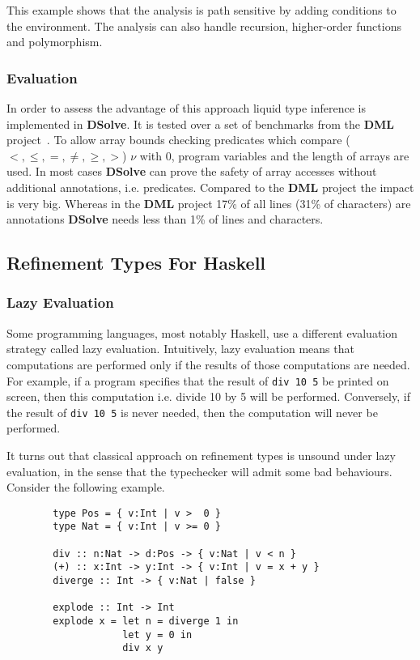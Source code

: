 \documentclass[a4paper,UKenglish]{lipics-v2016}
\begin{document}
This example shows that the analysis is path sensitive by adding conditions to the environment.
The analysis can also handle recursion, higher-order functions and polymorphism.

\subsubsection{Evaluation}

In order to assess the advantage of this approach liquid type inference is implemented in \textbf{DSolve}.
It is tested over a set of benchmarks from the \textbf{DML} project~\cite{Xi:1998:EAB}.
To allow array bounds checking predicates which compare ($<, \le, =, \neq, \geq, >$) $\nu$ with 0, program variables and the length of arrays are used.
In most cases \textbf{DSolve} can prove the safety of array accesses without additional annotations, i.e. predicates.
Compared to the \textbf{DML} project the impact is very big.
Whereas in the \textbf{DML} project 17\% of all lines (31\% of characters) are annotations \textbf{DSolve} needs less than 1\% of lines and characters.


  \subsection{Refinement Types For Haskell}

    \subsubsection{Lazy Evaluation}

      Some programming languages, most notably Haskell, use a different
      evaluation strategy called lazy evaluation.  Intuitively, lazy evaluation
      means that computations are performed only if the results of those
      computations are needed.  For example, if a program specifies that the
      result of \texttt{div 10 5} be printed on screen, then this computation
      i.e. divide 10 by 5 will be performed.  Conversely, if the result of
      \texttt{div 10 5} is never needed, then the computation will never be
      performed.

      It turns out that classical approach on refinement types is unsound under
      lazy evaluation, in the sense that the typechecker will admit some bad
      behaviours.  Consider the following example.
      \begin{verbatim}
        type Pos = { v:Int | v >  0 }
        type Nat = { v:Int | v >= 0 }

        div :: n:Nat -> d:Pos -> { v:Nat | v < n } 
        (+) :: x:Int -> y:Int -> { v:Int | v = x + y }
        diverge :: Int -> { v:Nat | false } 

        explode :: Int -> Int
        explode x = let n = diverge 1 in 
                    let y = 0 in 
                    div x y
      \end{verbatim}
\end{document}

